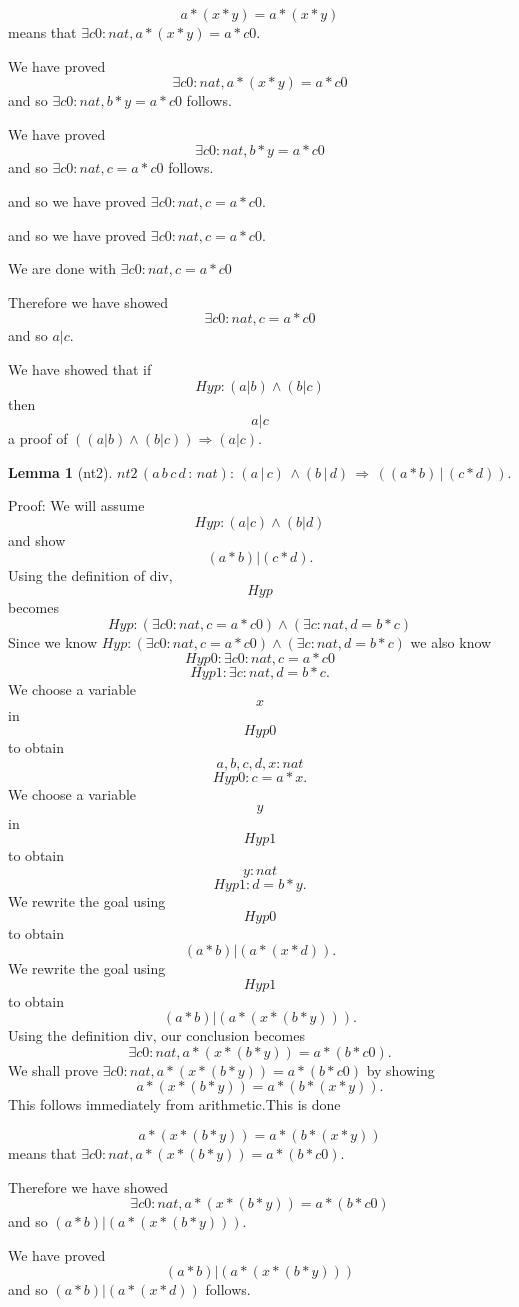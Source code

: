\documentclass[11pt, oneside]{article}
\newtheorem{Lemma}{Lemma}
\begin{document}
 $$a * (x * y) = a * (x * y) $$ means that $\exists c0 : nat, a * (x * y) = a * c0 $.

 We have proved $$\exists c0 : nat, a * (x * y) = a * c0 $$ and so $\exists c0 : nat, b * y = a * c0 $ follows.

 We have proved $$\exists c0 : nat, b * y = a * c0 $$ and so $\exists c0 : nat, c = a * c0 $ follows.

 and so we have proved $\exists c0 : nat, c = a * c0 $.

 and so we have proved $\exists c0 : nat, c = a * c0 $.

 We are done with $\exists c0 : nat, c = a * c0 $

 Therefore we have showed $$\exists c0 : nat, c = a * c0 $$ and so $a | c $.

 We have showed that if $$Hyp : (a | b) \land (b | c) $$ then $$a | c $$ a proof of $((a | b) \land (b | c)) \Rightarrow (a | c) $.\begin{Lemma}[nt2] \label{Lemma:nt2}
$nt2\,(a\,b\,c\,d\,:\,nat):\,(a\,|\,c)\,\land (b\,|\,d)\,\Rightarrow \,((a*b)\,|\,(c*d)).$
 \end{Lemma}


 Proof: We will assume $$Hyp : (a | c) \land (b | d) $$ and show $$(a * b) | (c * d) .$$Using the definition of div, $$Hyp $$ becomes $$Hyp : (\exists c0 : nat, c = a * c0) \land (\exists c : nat, d = b * c) $$ Since we know $Hyp : (\exists c0 : nat, c = a * c0) \land (\exists c : nat, d = b * c) $ we also know $$Hyp0 : \exists c0 : nat, c = a * c0 $$ $$Hyp1 : \exists c : nat, d = b * c .$$We choose a variable $$x$$ in $$Hyp0 $$ to obtain $$a, b, c, d, x : nat $$ $$Hyp0 : c = a * x .$$ We choose a variable $$y$$ in $$Hyp1 $$ to obtain $$y : nat $$ $$Hyp1 : d = b * y .$$ We rewrite the goal using $$Hyp0 $$ to obtain $$(a * b) | (a * (x * d)) .$$We rewrite the goal using $$Hyp1 $$ to obtain $$(a * b) | (a * (x * (b * y))) .$$Using the definition div, our conclusion becomes $$\exists c0 : nat, a * (x * (b * y)) = a * (b * c0) .$$We shall prove $\exists c0 : nat, a * (x * (b * y)) = a * (b * c0) $ by showing $$a * (x * (b * y)) = a * (b * (x * y)) .$$This follows immediately from arithmetic.This is done

 $$a * (x * (b * y)) = a * (b * (x * y)) $$ means that $\exists c0 : nat, a * (x * (b * y)) = a * (b * c0) $.

 Therefore we have showed $$\exists c0 : nat, a * (x * (b * y)) = a * (b * c0) $$ and so $(a * b) | (a * (x * (b * y))) $.

 We have proved $$(a * b) | (a * (x * (b * y))) $$ and so $(a * b) | (a * (x * d)) $ follows.
\end{document}
